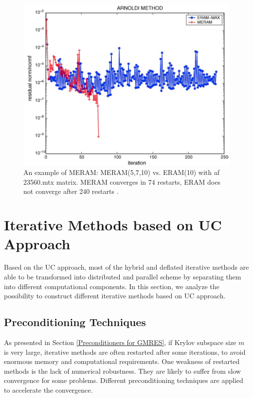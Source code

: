 \begin{figure}[t]
	\centering
	\includegraphics[width=6.2in]{fig/meram_perf.png}
	\caption{An example of MERAM: MERAM(5,7,10) vs. ERAM(10) with af 23560.mtx matrix. MERAM converges in 74 restarts, ERAM does not converge after 240 restarts \cite{emad2005multiple}.}
	\label{meram-perf}
\end{figure}

\section{Iterative Methods based on UC Approach}\label{Iterative Methods based on UC Approach}

 Based on the UC approach, most of the hybrid and deflated iterative methods are able to be transformed into distributed and parallel scheme by separating them into different computational components. In this section, we analyze the possibility to construct different iterative methods based on UC approach.

\subsection{Preconditioning Techniques}

As presented in Section \ref{Preconditioners for GMRES}, if Krylov subspace size $m$ is very large, iterative methods are often restarted after some iterations, to avoid enormous memory and computational requirements. One weakness of restarted methods is the lack of numerical robustness. They are likely to suffer from slow convergence for some problems. Different preconditioning techniques are applied to accelerate the convergence.

